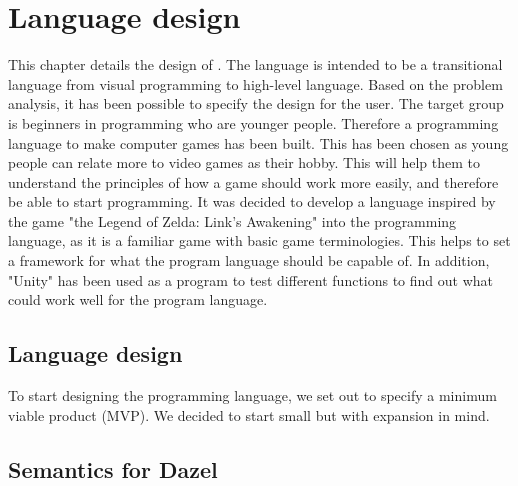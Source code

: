 \chapter{Language design}
This chapter details the design of \dazel.
The language is intended to be a transitional language from visual programming to high-level language. Based on the problem analysis, it has been possible to specify the design for the user.
The target group is beginners in programming who are younger people. Therefore a programming language to make computer games has been built. This has been chosen as young people can relate more to video games as their hobby. 
This will help them to understand the principles of how a game should work more easily, and therefore be able to start programming. 
It was decided to develop a language inspired by the game "the Legend of Zelda: Link’s Awakening" into the programming language, as it is a familiar game with basic game terminologies.
This helps to set a framework for what the program language should be capable of.
In addition, "Unity" has been used as a program to test different functions to find out what could work well for the program language.



\section{Language design}

To start designing the programming language, we set out to specify a minimum viable product (MVP). We decided to start small but with expansion in mind.












\section{Semantics for Dazel}

